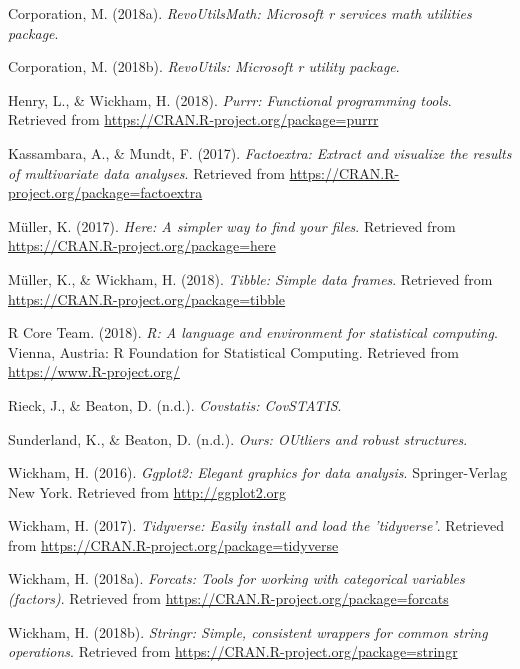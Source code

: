 \documentclass[man,floatsintext]{apa6}
\theoremstyle{definition}
\theoremstyle{definition}
\theoremstyle{definition}
\theoremstyle{remark}
\begin{document}
\leavevmode\hypertarget{ref-R-RevoUtilsMath}{}%
Corporation, M. (2018a). \emph{RevoUtilsMath: Microsoft r services math
utilities package}.

\leavevmode\hypertarget{ref-R-RevoUtils}{}%
Corporation, M. (2018b). \emph{RevoUtils: Microsoft r utility package}.

\leavevmode\hypertarget{ref-R-purrr}{}%
Henry, L., \& Wickham, H. (2018). \emph{Purrr: Functional programming
tools}. Retrieved from \url{https://CRAN.R-project.org/package=purrr}

\leavevmode\hypertarget{ref-R-factoextra}{}%
Kassambara, A., \& Mundt, F. (2017). \emph{Factoextra: Extract and
visualize the results of multivariate data analyses}. Retrieved from
\url{https://CRAN.R-project.org/package=factoextra}

\leavevmode\hypertarget{ref-R-here}{}%
Müller, K. (2017). \emph{Here: A simpler way to find your files}.
Retrieved from \url{https://CRAN.R-project.org/package=here}

\leavevmode\hypertarget{ref-R-tibble}{}%
Müller, K., \& Wickham, H. (2018). \emph{Tibble: Simple data frames}.
Retrieved from \url{https://CRAN.R-project.org/package=tibble}

\leavevmode\hypertarget{ref-R-base}{}%
R Core Team. (2018). \emph{R: A language and environment for statistical
computing}. Vienna, Austria: R Foundation for Statistical Computing.
Retrieved from \url{https://www.R-project.org/}

\leavevmode\hypertarget{ref-R-covstatis}{}%
Rieck, J., \& Beaton, D. (n.d.). \emph{Covstatis: CovSTATIS}.

\leavevmode\hypertarget{ref-R-ours}{}%
Sunderland, K., \& Beaton, D. (n.d.). \emph{Ours: OUtliers and robust
structures}.

\leavevmode\hypertarget{ref-R-ggplot2}{}%
Wickham, H. (2016). \emph{Ggplot2: Elegant graphics for data analysis}.
Springer-Verlag New York. Retrieved from \url{http://ggplot2.org}

\leavevmode\hypertarget{ref-R-tidyverse}{}%
Wickham, H. (2017). \emph{Tidyverse: Easily install and load the
'tidyverse'}. Retrieved from
\url{https://CRAN.R-project.org/package=tidyverse}

\leavevmode\hypertarget{ref-R-forcats}{}%
Wickham, H. (2018a). \emph{Forcats: Tools for working with categorical
variables (factors)}. Retrieved from
\url{https://CRAN.R-project.org/package=forcats}

\leavevmode\hypertarget{ref-R-stringr}{}%
Wickham, H. (2018b). \emph{Stringr: Simple, consistent wrappers for
common string operations}. Retrieved from
\url{https://CRAN.R-project.org/package=stringr}
\end{document}
